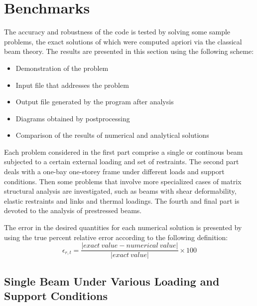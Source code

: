 \lstset{basicstyle=\ttfamily\scriptsize, columns=fullflexible, keepspaces=true}
\section{Benchmarks}
The accuracy and robustness of the code is tested by solving some sample 
problems, the exact solutions of which were computed apriori via the classical
beam theory. The results are presented in this section using the following scheme: 
\begin{itemize}
    \item Demonstration of the problem
    \item Input file that addresses the problem
    \item Output file generated by the program after analysis
    \item Diagrams obtained by postprocessing 
    \item Comparison of the results of numerical and analytical solutions
\end{itemize}
Each problem considered in the first part comprise a single or continous beam 
subjected to  a certain external loading and set of restraints. The second part 
deals with a one-bay one-storey frame under different loads and support conditions.
Then some problems that involve more specialized cases of matrix structural analysis
are investigated, such as beams with shear deformability, elastic restraints and links and
thermal loadings. The fourth and final part is devoted to the analysis of prestressed beams.
\par
The error in the desired quantities for each numerical solution is presented by using the true
percent relative error according to the following definition:
\begin{equation*}
    \epsilon_{r,t} = \frac{|exact \: value - numerical \: value|}
                          {|exact \: value|} \times 100
\end{equation*}
%
%
\subsection{Single Beam Under Various Loading and Support Conditions}
%
%
